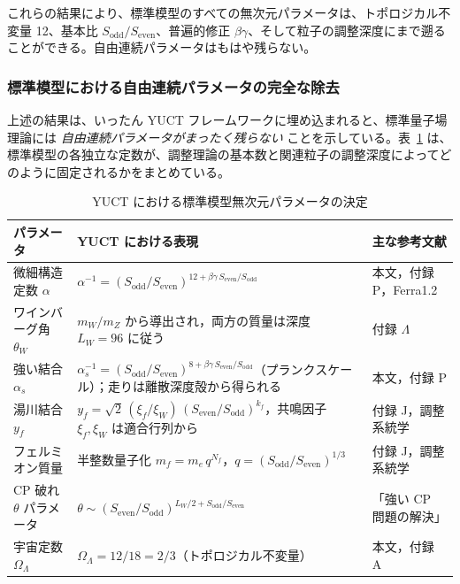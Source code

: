 \documentclass[12pt,a4paper]{article}
\begin{document}
	これらの結果により、標準模型のすべての無次元パラメータは、トポロジカル不変量 12、基本比 \(S_{\mathrm{odd}}/S_{\mathrm{even}}\)、普遍的修正 \(\beta\gamma\)、そして粒子の調整深度にまで遡ることができる。自由連続パラメータはもはや残らない。
	
	\subsubsection{標準模型における自由連続パラメータの完全な除去}
	
	上述の結果は、いったん YUCT フレームワークに埋め込まれると、標準量子場理論には \emph{自由連続パラメータがまったく残らない} ことを示している。表~\ref{tab:SMparams} は、標準模型の各独立な定数が、調整理論の基本数と関連粒子の調整深度によってどのように固定されるかをまとめている。
	
	\begin{table}[htbp]
		\centering
		\caption{YUCT における標準模型無次元パラメータの決定}
		\label{tab:SMparams}
		\small
		\begin{tabular}{@{}p{3.0cm} p{5.2cm} p{5.2cm}@{}}
			\toprule
			\textbf{パラメータ} & \textbf{YUCT における表現} & \textbf{主な参考文献} \\
			\midrule
			微細構造定数 \(\alpha\) &
			\(\alpha^{-1} = (S_{\mathrm{odd}}/S_{\mathrm{even}})^{12+\beta\gamma\,S_{\mathrm{even}}/S_{\mathrm{odd}}}\) &
			本文，付録 P，Ferra1.2 \\
			ワインバーグ角 \(\theta_W\) &
			\(m_W/m_Z\) から導出され，両方の質量は深度 \(L_W=96\) に従う &
			付録 \(\Lambda\) \\
			強い結合 \(\alpha_s\) &
			\(\alpha_s^{-1} = (S_{\mathrm{odd}}/S_{\mathrm{even}})^{8+\beta\gamma\,S_{\mathrm{even}}/S_{\mathrm{odd}}}\)（プランクスケール）；走りは離散深度殻から得られる &
			本文，付録 P \\
			湯川結合 \(y_f\) &
			\(y_f = \sqrt{2}\,(\xi_f/\xi_W)\,(S_{\mathrm{even}}/S_{\mathrm{odd}})^{k_f}\)，共鳴因子 \(\xi_f,\xi_W\) は適合行列から &
			付録 J，調整系統学 \\
			フェルミオン質量 & 半整数量子化 \(m_f = m_e\,q^{N_f}\)，\(q=(S_{\mathrm{odd}}/S_{\mathrm{even}})^{1/3}\) &
			付録 J，調整系統学 \\
			CP 破れ \(\theta\) パラメータ &
			\(\theta \sim (S_{\mathrm{even}}/S_{\mathrm{odd}})^{L_W/2 + S_{\mathrm{odd}}/S_{\mathrm{even}}}\) &
			「強い CP 問題の解決」 \\
			宇宙定数 \(\Omega_\Lambda\) &
			\(\Omega_\Lambda = 12/18 = 2/3\)（トポロジカル不変量） &
			本文，付録 A \\
			\bottomrule
		\end{tabular}
	\end{table}
	
\end{document}
